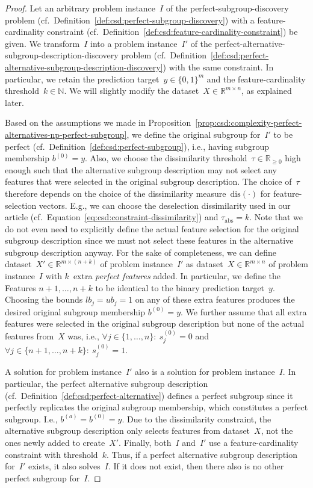 \documentclass{article}
\theoremstyle{definition}
\begin{document}
\begin{proof}
Let an arbitrary problem instance~$I$ of the perfect-subgroup-discovery problem (cf.~Definition~\ref{def:csd:perfect-subgroup-discovery}) with a feature-cardinality constraint (cf.~Definition~\ref{def:csd:feature-cardinality-constraint}) be given.	
We transform~$I$ into a problem instance~$I'$ of the perfect-alternative-subgroup-description-discovery problem (cf.~Definition~\ref{def:csd:perfect-alternative-subgroup-description-discovery}) with the same constraint.
In particular, we retain the prediction target~$y \in \{0,1\}^m$ and the feature-cardinality threshold~$k \in \mathbb{N}$.
We will slightly modify the dataset~$X \in \mathbb{R}^{m \times n}$, as explained later.

Based on the assumptions we made in Proposition~\ref{prop:csd:complexity-perfect-alternatives-np-perfect-subgroup}, we define the original subgroup for~$I'$ to be perfect (cf.~Definition~\ref{def:csd:perfect-subgroup}), i.e., having subgroup membership $b^{(0)} = y$.
Also, we choose the dissimilarity threshold~$\tau \in \mathbb{R}_{\geq 0}$ high enough such that the alternative subgroup description may not select any features that were selected in the original subgroup description.
The choice of~$\tau$ therefore depends on the choice of the dissimilarity measure~$\text{dis}(\cdot)$ for feature-selection vectors.
E.g., we can choose the deselection dissimilarity used in our article (cf.~Equation~\ref{eq:csd:constraint-dissimilarity}) and $\tau_{\text{abs}} = k$.
Note that we do not even need to explicitly define the actual feature selection for the original subgroup description since we must not select these features in the alternative subgroup description anyway.
For the sake of completeness, we can define dataset~$X' \in \mathbb{R}^{m \times (n+k)}$ of problem instance~$I'$ as dataset~$X \in \mathbb{R}^{m \times n}$ of problem instance~$I$ with $k$~extra \emph{perfect features} added.
In particular, we define the Features $n+1, \dots, n+k$ to be identical to the binary prediction target~$y$.
Choosing the bounds $\mathit{lb}_j = \mathit{ub}_j = 1$ on any of these extra features produces the desired original subgroup membership $b^{(0)} = y$.
We further assume that all extra features were selected in the original subgroup description but none of the actual features from~$X$ was, i.e., $\forall j \in \{1, \dots, n\}:~ s^{(0)}_j = 0$ and $\forall j \in \{n+1, \dots, n+k\}:~ s^{(0)}_j = 1$.

A solution for problem instance~$I'$ also is a solution for problem instance~$I$.
In particular, the perfect alternative subgroup description (cf.~Definition~\ref{def:csd:perfect-alternative}) defines a perfect subgroup since it perfectly replicates the original subgroup membership, which constitutes a perfect subgroup.
I.e., $b^{(a)} = b^{(0)} = y$.
Due to the dissimilarity constraint, the alternative subgroup description only selects features from dataset~$X$, not the ones newly added to create~$X'$.
Finally, both~$I$ and~$I'$ use a feature-cardinality constraint with threshold~$k$.
Thus, if a perfect alternative subgroup description for~$I'$ exists, it also solves~$I$.
If it does not exist, then there also is no other perfect subgroup for~$I$.


\end{proof}
\end{document}
